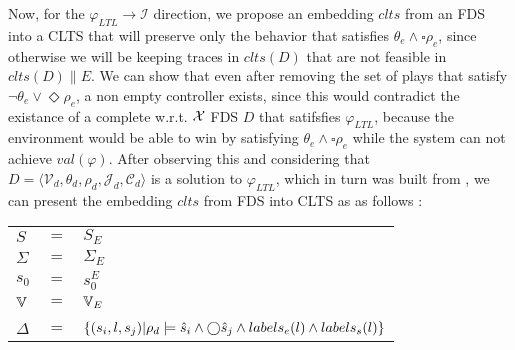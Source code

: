 Now,  for the $\varphi_{LTL} \rightarrow \mathcal{I}$ direction, we propose an embedding $clts$ from an FDS into a CLTS that will preserve only the behavior that satisfies $\theta_e \wedge \square \rho_e$, since otherwise we will be keeping traces in $clts(D)$ that are not feasible in $clts(D)\parallel E$. We can show that even after removing the set of plays that satisfy $\neg \theta_e \vee \Diamond \rho_e$, a non empty controller exists, since this would contradict the existance of a complete w.r.t. ${\mathcal{X}}$ FDS $D$ that satifsfies $\varphi_{LTL}$, because the environment would be able to win by satisfying $\theta_e \wedge \square \rho_e$ while the system can not achieve $val(\varphi)$. After observing this and considering that  $D= \langle \mathcal{V}_d, \theta_d, \rho_d, \mathcal{J}_d, \mathcal{C}_d\rangle$ is a solution to $\varphi_{LTL}$, which in turn was built from \controlProblemDef,  we can present the embedding $clts$ from FDS into CLTS as  as follows :

\vspace{1em}
\begin{tabular}{ l c l }
	$S$ &$=$& $S_E$\\
	$\Sigma$ &$=$&$\Sigma_E$\\	
	$s_0$&$=$&$s_0^{E}$\\
	${\mathbb{V}}$&$=$&${\mathbb{V}}_E$\\
	&&\\
	$\Delta$&$=$&$\{(s_i,l,s_j)| \rho_d \models \hat{s}_{i} \wedge \bigcirc \hat{s}_{j} \wedge labels_e(l) \wedge labels_s(l) \}$\\
\end{tabular}
\vspace{1em}